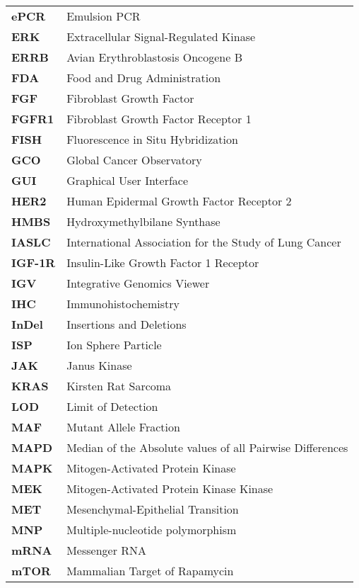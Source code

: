 \begin{longtable}[l]{l l}
    \textbf{ePCR} & Emulsion PCR \\
    \textbf{ERK} & Extracellular Signal-Regulated Kinase \\
    \textbf{ERRB} & Avian Erythroblastosis Oncogene B \\
    \textbf{FDA} & Food and Drug Administration \\
    \textbf{FGF} & Fibroblast Growth Factor \\
    \textbf{FGFR1} & Fibroblast Growth Factor Receptor 1 \\
    \textbf{FISH} & Fluorescence in Situ Hybridization \\
    \textbf{GCO} & Global Cancer Observatory \\
    \textbf{GUI} & Graphical User Interface \\
    \textbf{HER2} & Human Epidermal Growth Factor Receptor 2 \\
    \textbf{HMBS} & Hydroxymethylbilane Synthase \\
    \textbf{IASLC} & International Association for the Study of Lung Cancer \\
    \textbf{IGF-1R} & Insulin-Like Growth Factor 1 Receptor \\
    \textbf{IGV} & Integrative Genomics Viewer \\
    \textbf{IHC} & Immunohistochemistry \\
    \textbf{InDel} & Insertions and Deletions \\
    \textbf{ISP} & Ion Sphere\texttrademark{} Particle \\
    \textbf{JAK} & Janus Kinase \\
    \textbf{KRAS} & Kirsten Rat Sarcoma \\
    \textbf{LOD} & Limit of Detection \\
    \textbf{MAF} & Mutant Allele Fraction \\
    \textbf{MAPD} & Median of the Absolute values of all Pairwise Differences \\
    \textbf{MAPK} & Mitogen-Activated Protein Kinase \\
    \textbf{MEK} & Mitogen-Activated Protein Kinase Kinase \\
    \textbf{MET} & Mesenchymal-Epithelial Transition \\
    \textbf{MNP} & Multiple-nucleotide polymorphism \\
    \textbf{mRNA} & Messenger RNA \\
    \textbf{mTOR} & Mammalian Target of Rapamycin \\

\end{longtable}
